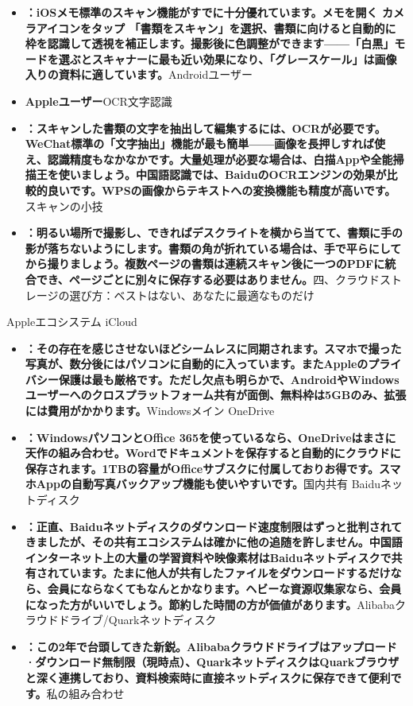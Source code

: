 \begin{itemize}
  \item \textbf{：iOSメモ標準のスキャン機能がすでに十分優れています。メモを開く カメラアイコンをタップ 「書類をスキャン」を選択、書類に向けると自動的に枠を認識して透視を補正します。撮影後に色調整ができます——「白黒」モードを選ぶとスキャナーに最も近い効果になり、「グレースケール」は画像入りの資料に適しています。}Androidユーザー
  \item \textbf{Appleユーザー}OCR文字認識
  \item \textbf{：スキャンした書類の文字を抽出して編集するには、OCRが必要です。WeChat標準の「文字抽出」機能が最も簡単——画像を長押しすれば使え、認識精度もなかなかです。大量処理が必要な場合は、白描Appや全能掃描王を使いましょう。中国語認識では、BaiduのOCRエンジンの効果が比較的良いです。WPSの画像からテキストへの変換機能も精度が高いです。}スキャンの小技
  \item \textbf{：明るい場所で撮影し、できればデスクライトを横から当てて、書類に手の影が落ちないようにします。書類の角が折れている場合は、手で平らにしてから撮りましょう。複数ページの書類は連続スキャン後に一つのPDFに統合でき、ページごとに別々に保存する必要はありません。}四、クラウドストレージの選び方：ベストはない、あなたに最適なものだけ
\end{itemize}


Appleエコシステム iCloud

\begin{itemize}
  \item \textbf{：その存在を感じさせないほどシームレスに同期されます。スマホで撮った写真が、数分後にはパソコンに自動的に入っています。またAppleのプライバシー保護は最も厳格です。ただし欠点も明らかで、AndroidやWindowsユーザーへのクロスプラットフォーム共有が面倒、無料枠は5GBのみ、拡張には費用がかかります。}Windowsメイン OneDrive
  \item \textbf{：WindowsパソコンとOffice 365を使っているなら、OneDriveはまさに天作の組み合わせ。Wordでドキュメントを保存すると自動的にクラウドに保存されます。1TBの容量がOfficeサブスクに付属しておりお得です。スマホAppの自動写真バックアップ機能も使いやすいです。}国内共有 Baiduネットディスク
  \item \textbf{：正直、Baiduネットディスクのダウンロード速度制限はずっと批判されてきましたが、その共有エコシステムは確かに他の追随を許しません。中国語インターネット上の大量の学習資料や映像素材はBaiduネットディスクで共有されています。たまに他人が共有したファイルをダウンロードするだけなら、会員にならなくてもなんとかなります。ヘビーな資源収集家なら、会員になった方がいいでしょう。節約した時間の方が価値があります。}Alibabaクラウドドライブ/Quarkネットディスク
  \item \textbf{：この2年で台頭してきた新鋭。Alibabaクラウドドライブはアップロード·ダウンロード無制限（現時点）、QuarkネットディスクはQuarkブラウザと深く連携しており、資料検索時に直接ネットディスクに保存できて便利です。}私の組み合わせ
\end{itemize}

